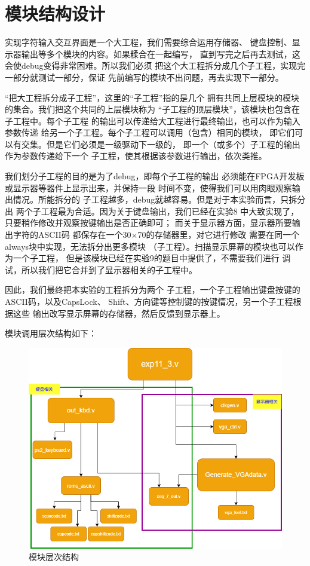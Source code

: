 \documentclass[12pt,a4paper,UTF8]{article}
\begin{document}
\section{模块结构设计}
实现字符输入交互界面是一个大工程，我们需要综合运用存储器、
键盘控制、显示器输出等多个模块的内容。如果糅合在一起编写，
直到写完之后再去测试，这会使debug变得非常困难。所以我们必须
把这个大工程拆分成几个子工程，实现完一部分就测试一部分，保证
先前编写的模块不出问题，再去实现下一部分。

``把大工程拆分成子工程''，这里的``子工程''指的是几个
拥有共同上层模块的模块的集合。我们把这个共同的上层模块称为
``子工程的顶层模块''，该模块也包含在子工程中。每个子工程
的输出可以传递给大工程进行最终输出，也可以作为输入参数传递
给另一个子工程。每个子工程可以调用（包含）相同的模块，
即它们可以有交集。但是它们必须是一级驱动下一级的，
即一个（或多个）子工程的输出作为参数传递给下一个
子工程，使其根据该参数进行输出，依次类推。

我们划分子工程的目的是为了debug，即每个子工程的输出
必须能在\linebreak[4]
FPGA开发板或显示器等器件上显示出来，并保持一段
时间不变，使得我们可以用肉眼观察输出情况。所能拆分的
子工程越多，debug就越容易。但是对于本实验而言，只拆分出
两个子工程最为合适。因为关于键盘输出，我们已经在实验8
中大致实现了，只要稍作修改并观察按键输出是否正确即可；
而关于显示器方面，显示器所要输出字符的ASCII码
都保存在一个30$\times$70的存储器里，对它进行修改
需要在同一个always块中实现，无法拆分出更多模块
（子工程）。扫描显示屏幕的模块也可以作为一个子工程，
但是该模块已经在实验9的题目中提供了，不需要我们进行
调试，所以我们把它合并到了显示器相关的子工程中。

因此，我们最终把本实验的工程拆分为两个
子工程，一个子工程输出键盘按键的ASCII码，以及CapsLock、
Shift、方向键等控制键的按键情况，另一个子工程根据这些
输出改写显示屏幕的存储器，然后反馈到显示器上。

模块调用层次结构如下：
\begin{figure}[H]
  \centering
  \includegraphics[width=1\textwidth]{code_structure.PNG}
  \caption{模块层次结构}
  \label{struct}
\end{figure}
\end{document}
